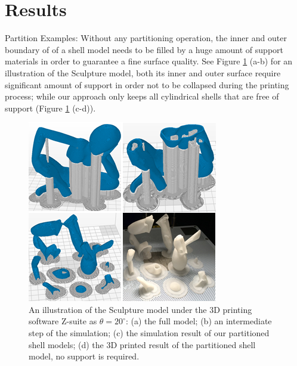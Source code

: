 \section{Results}

Partition Examples: Without any partitioning operation, the inner and outer boundary of of a shell model needs to be filled by a huge amount of support materials in order to guarantee a fine surface quality. See Figure \ref{fig:dear-simulation} (a-b) for an illustration of the Sculpture model, both its inner and outer surface require significant amount of support in order not to be collapsed during the printing process; while our approach only keeps all cylindrical shells that are free of support (Figure \ref{fig:dear-simulation} (c-d)).

\begin{figure}[tbp]
  \centering
  \includegraphics[width=\linewidth]{figs/dear-simulation.png}
  \caption{\label{fig:dear-simulation}%
           An illustration of the Sculpture model under the 3D printing software Z-suite as $\theta = 20^{\circ}$: (a) the full model; (b) an intermediate step of the simulation; (c) the simulation result of our partitioned shell models; (d) the 3D printed result of the partitioned shell model, no support is required.}
\end{figure}


